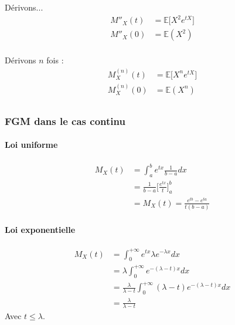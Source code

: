 \documentclass{article}
\begin{document}
Dérivons...
\begin{align*}
  M''_X(t) &= \mathbb{E}\Big[ X^2 e^{tX}\Big] \\
  M''_X(0) &= \mathbb{E}(X^2) \\
\end{align*}

Dérivons $n$ fois :
\begin{align*}
  M^{(n)}_X(t) &= \mathbb{E}\Big[ X^n e^{tX}\Big] \\
  M^{(n)}_X(0) &= \mathbb{E}(X^n) \\
\end{align*}

\subsubsection{FGM dans le cas continu}

\paragraph{Loi uniforme}

\begin{align*}
  M_X(t) &= \int_a^b e^{tx} \frac{1}{b-a}dx \\
  &= \frac{1}{b-a} \bigg[ \frac{e^{tx}}{t} \bigg]^b_a \\
  &= M_X(t) = \frac{e^{tb}- e^{ta}}{t(b-a)}
\end{align*}

\paragraph{Loi exponentielle}

\begin{align*}
  M_X(t) &= \int_0^{+ \infty} e^{tx} \lambda e^{-\lambda x}dx \\
  &= \lambda \int_0^{+ \infty} e^{-(\lambda - t)x}dx \\
  &= \frac{\lambda}{\lambda-t} \int_0^{+ \infty} (\lambda - t)e^{-(\lambda - t)x}dx \\
  &= \frac{\lambda}{\lambda - t}
\end{align*}
Avec $t \leq \lambda$.
\end{document}
